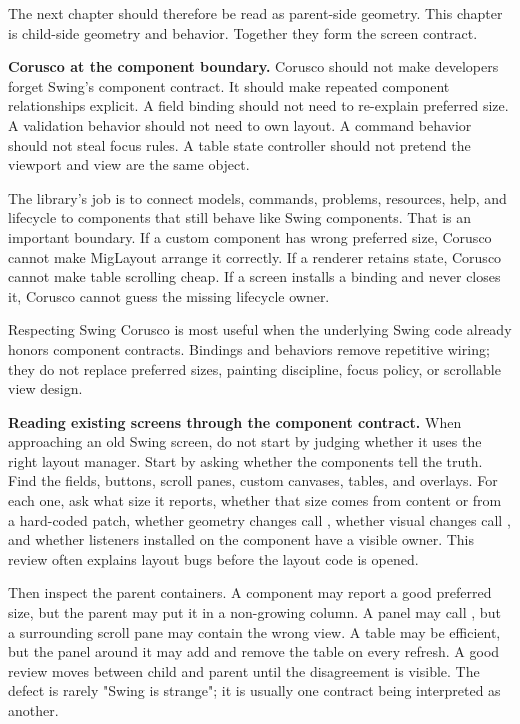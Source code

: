 The next chapter should therefore be read as parent-side geometry. This chapter is child-side geometry and behavior. Together they form the screen contract.

\textbf{Corusco at the component boundary.} Corusco should not make developers forget Swing's component contract. It should make repeated component relationships explicit. A field binding should not need to re-explain preferred size. A validation behavior should not need to own layout. A command behavior should not steal focus rules. A table state controller should not pretend the viewport and view are the same object.

The library's job is to connect models, commands, problems, resources, help, and lifecycle to components that still behave like Swing components. That is an important boundary. If a custom component has wrong preferred size, Corusco cannot make MigLayout arrange it correctly. If a renderer retains state, Corusco cannot make table scrolling cheap. If a screen installs a binding and never closes it, Corusco cannot guess the missing lifecycle owner.

\begin{coruscobox}{Respecting Swing}
Corusco is most useful when the underlying Swing code already honors component contracts. Bindings and behaviors remove repetitive wiring; they do not replace preferred sizes, painting discipline, focus policy, or scrollable view design.
\end{coruscobox}

\textbf{Reading existing screens through the component contract.} When approaching an old Swing screen, do not start by judging whether it uses the
right layout manager. Start by asking whether the components tell the truth.
Find the fields, buttons, scroll panes, custom canvases, tables, and overlays.
For each one, ask what size it reports, whether that size comes from content or
from a hard-coded patch, whether geometry changes call , whether
visual changes call , and whether listeners installed on the
component have a visible owner. This review often explains layout bugs before
the layout code is opened.

Then inspect the parent containers. A component may report a good preferred
size, but the parent may put it in a non-growing column. A panel may call
, but a surrounding scroll pane may contain the wrong view. A
table may be efficient, but the panel around it may add and remove the table on
every refresh. A good review moves between child and parent until the
disagreement is visible. The defect is rarely "Swing is strange"; it is usually
one contract being interpreted as another.

